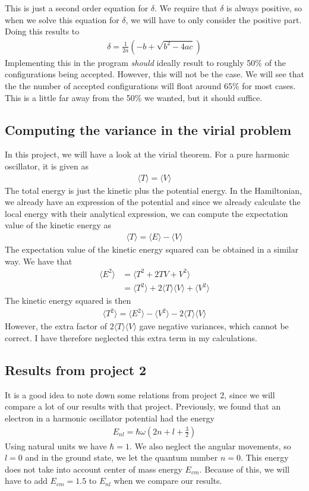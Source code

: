 \documentclass[12pt]{article}
\begin{document}
This is just a second order equation for $\delta$. We require that $\delta$ is always positive, so when we solve this equation for $\delta$, we will have to only consider the positive part. Doing this results to
\begin{align}
\delta = \frac{1}{2a}(-b + \sqrt{b^2 - 4ac})
\label{eq:step_length_algo}
\end{align}
Implementing this in the program \emph{should} ideally result to roughly 50\% of the configurations being accepted. However, this will not be the case. We will see that the the number of accepted configurations will float around 65\% for most cases. This is a little far away from the 50\% we wanted, but it should suffice.

\subsection{Computing the variance in the virial problem}
In this project, we will have a look at the virial theorem. For a pure harmonic oscillator, it is given as
\begin{align*}
\langle T \rangle = \langle V \rangle
\end{align*}
The total energy is just the kinetic plus the potential energy. In the Hamiltonian, we already have an expression of the potential and since we already calculate the local energy with their analytical expression, we can compute the expectation value of the kinetic energy as
\begin{align*}
\langle T \rangle = \langle E \rangle - \langle V \rangle
\end{align*}
The expectation value of the kinetic energy squared can be obtained in a similar way. We have that
\begin{align*}
\langle E^2 \rangle &= \langle T^2 + 2TV + V^2 \rangle\\
&= \langle T^2 \rangle + 2 \langle T \rangle \langle V \rangle + \langle V^2 \rangle
\end{align*}
The kinetic energy squared is then
\begin{align*}
\langle T^2 \rangle = \langle E^2 \rangle - \langle V^2\rangle - 2 \langle T \rangle \langle V \rangle
\end{align*}
However, the extra factor of $2 \langle T \rangle \langle V \rangle$ gave negative variances, which cannot be correct. I have therefore neglected this extra term in my calculations.
\subsection{Results from project 2}
It is a good idea to note down some relations from project 2, since we will compare a lot of our results with that project. Previously, we found that an electron in a harmonic oscillator potential had the energy
\begin{align*}
E_{nl} = \hbar \omega \left(2n + l + \frac{3}{2} \right)
\end{align*}
Using natural units we have $\hbar = 1$. We also neglect the angular movements, so $l = 0$ and in the ground state, we let the quantum number $n=0$. This energy does not take into account center of mass energy $E_{cm}$. Because of this, we will have to add $E_{cm} = 1.5$ to $E_{nl}$ when we compare our results.
\end{document}
